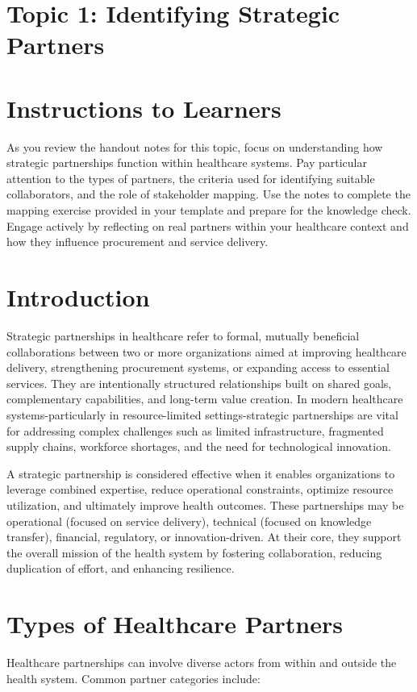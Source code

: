 \documentclass[10pt]{article}
\begin{document}
\section*{Topic 1: Identifying Strategic Partners}
\section*{Instructions to Learners}
As you review the handout notes for this topic, focus on understanding how strategic partnerships function within healthcare systems. Pay particular attention to the types of partners, the criteria used for identifying suitable collaborators, and the role of stakeholder mapping. Use the notes to complete the mapping exercise provided in your template and prepare for the knowledge check. Engage actively by reflecting on real partners within your healthcare context and how they influence procurement and service delivery.

\section*{Introduction}
Strategic partnerships in healthcare refer to formal, mutually beneficial collaborations between two or more organizations aimed at improving healthcare delivery, strengthening procurement systems, or expanding access to essential services. They are intentionally structured relationships built on shared goals, complementary capabilities, and long-term value creation. In modern healthcare systems-particularly in resource-limited settings-strategic partnerships are vital for addressing complex challenges such as limited infrastructure, fragmented supply chains, workforce shortages, and the need for technological innovation.

A strategic partnership is considered effective when it enables organizations to leverage combined expertise, reduce operational constraints, optimize resource utilization, and ultimately improve health outcomes. These partnerships may be operational (focused on service delivery), technical (focused on knowledge transfer), financial, regulatory, or innovation-driven. At their core, they support the overall mission of the health system by fostering collaboration, reducing duplication of effort, and enhancing resilience.

\section*{Types of Healthcare Partners}
Healthcare partnerships can involve diverse actors from within and outside the health system. Common partner categories include:
\end{document}
